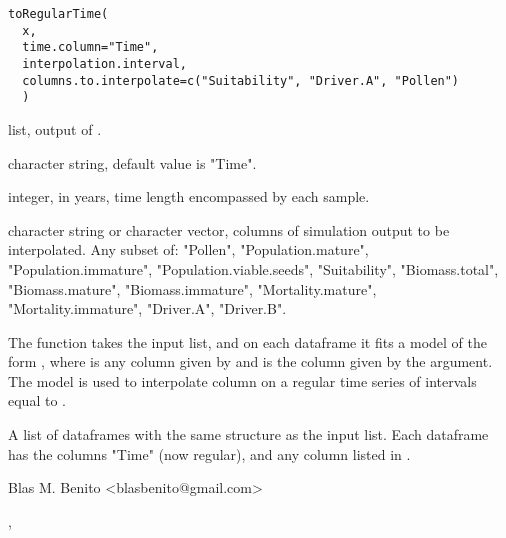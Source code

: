 \documentclass[letterpaper]{book}
\begin{document}
%
\begin{Usage}
\begin{verbatim}
toRegularTime(
  x,
  time.column="Time",
  interpolation.interval,
  columns.to.interpolate=c("Suitability", "Driver.A", "Pollen")
  )
\end{verbatim}
\end{Usage}
%
\begin{Arguments}
\begin{ldescription}
\item[\code{x}] list, output of .

\item[\code{time.column}] character string, default value is "Time".

\item[\code{interpolation.interval}] integer, in years, time length encompassed by each sample.

\item[\code{columns.to.interpolate}] character string or character vector, columns of simulation output to be interpolated. Any subset of: "Pollen", "Population.mature", "Population.immature", "Population.viable.seeds", "Suitability", "Biomass.total", "Biomass.mature", "Biomass.immature", "Mortality.mature", "Mortality.immature", "Driver.A", "Driver.B".
\end{ldescription}
\end{Arguments}
%
\begin{Details}\relax
The function takes the input list, and on each dataframe it fits a  model of the form , where  is any column given by  and  is the column given by the  argument. The model is used to interpolate column  on a regular time series of intervals equal to .
\end{Details}
%
\begin{Value}
A list of dataframes with the same structure as the input list. Each dataframe has the columns "Time" (now regular), and any column listed in .
\end{Value}
%
\begin{Author}\relax
Blas M. Benito  <blasbenito@gmail.com>
\end{Author}
%
\begin{SeeAlso}\relax
{}, 
\end{SeeAlso}
\end{document}
